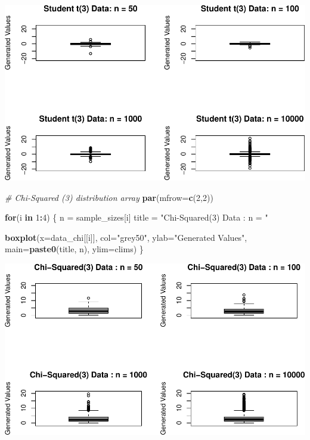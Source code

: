 \documentclass[9pt,letter]{article}
\newenvironment{Shaded}{\begin{snugshade}}{\end{snugshade}}
\newcommand{\KeywordTok}[1]{\textcolor[rgb]{0.13,0.29,0.53}{\textbf{#1}}}
\newcommand{\DataTypeTok}[1]{\textcolor[rgb]{0.13,0.29,0.53}{#1}}
\newcommand{\DecValTok}[1]{\textcolor[rgb]{0.00,0.00,0.81}{#1}}
\newcommand{\StringTok}[1]{\textcolor[rgb]{0.31,0.60,0.02}{#1}}
\newcommand{\CommentTok}[1]{\textcolor[rgb]{0.56,0.35,0.01}{\textit{#1}}}
\newcommand{\ControlFlowTok}[1]{\textcolor[rgb]{0.13,0.29,0.53}{\textbf{#1}}}
\newcommand{\OperatorTok}[1]{\textcolor[rgb]{0.81,0.36,0.00}{\textbf{#1}}}
\newcommand{\NormalTok}[1]{#1}
\begin{document}
\includegraphics{a3_solutions_files/figure-latex/unnamed-chunk-8-2.pdf}

\begin{Shaded}
\begin{Highlighting}[]
\CommentTok{# Chi-Squared (3) distribution array}
\KeywordTok{par}\NormalTok{(}\DataTypeTok{mfrow=}\KeywordTok{c}\NormalTok{(}\DecValTok{2}\NormalTok{,}\DecValTok{2}\NormalTok{))}

\ControlFlowTok{for}\NormalTok{(i }\ControlFlowTok{in} \DecValTok{1}\OperatorTok{:}\DecValTok{4}\NormalTok{) \{}
\NormalTok{  n =}\StringTok{ }\NormalTok{sample_sizes[i]}
\NormalTok{  title =}\StringTok{ "Chi-Squared(3) Data : n = "}
  
  \KeywordTok{boxplot}\NormalTok{(}\DataTypeTok{x=}\NormalTok{data_chi[[i]], }\DataTypeTok{col=}\StringTok{"grey50"}\NormalTok{,}
      \DataTypeTok{ylab=}\StringTok{"Generated Values"}\NormalTok{,}
      \DataTypeTok{main=}\KeywordTok{paste0}\NormalTok{(title, n),}
      \DataTypeTok{ylim=}\NormalTok{clims)}
\NormalTok{\}}
\end{Highlighting}
\end{Shaded}

\includegraphics{a3_solutions_files/figure-latex/unnamed-chunk-8-3.pdf}
\end{document}
